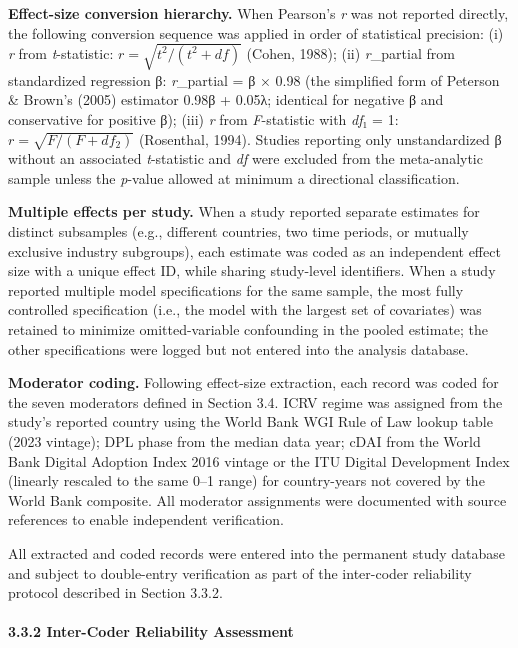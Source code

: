 \documentclass[
  12pt,a4paper]{article}
\begin{document}
\textbf{Effect-size conversion hierarchy.} When Pearson's \emph{r} was
not reported directly, the following conversion sequence was applied in
order of statistical precision: (i) \emph{r} from \emph{t}-statistic:
\(r = \sqrt{t^{2}/\left( t^{2} + df \right)}\) (Cohen, 1988); (ii)
\emph{r}\_partial from standardized regression β: \emph{r}\_partial = β
× 0.98 (the simplified form of Peterson \& Brown's (2005) estimator
0.98β + 0.05λ; identical for negative β and conservative for positive
β); (iii) \emph{r} from \emph{F}-statistic with \emph{df}₁ = 1:
\(r = \sqrt{F/\left( F + df_{2} \right)}\) (Rosenthal, 1994). Studies
reporting only unstandardized β without an associated \emph{t}-statistic
and \emph{df} were excluded from the meta-analytic sample unless the
\emph{p}-value allowed at minimum a directional classification.

\textbf{Multiple effects per study.} When a study reported separate
estimates for distinct subsamples (e.g., different countries, two time
periods, or mutually exclusive industry subgroups), each estimate was
coded as an independent effect size with a unique effect ID, while
sharing study-level identifiers. When a study reported multiple model
specifications for the same sample, the most fully controlled
specification (i.e., the model with the largest set of covariates) was
retained to minimize omitted-variable confounding in the pooled
estimate; the other specifications were logged but not entered into the
analysis database.

\textbf{Moderator coding.} Following effect-size extraction, each record
was coded for the seven moderators defined in Section 3.4. ICRV regime
was assigned from the study's reported country using the World Bank WGI
Rule of Law lookup table (2023 vintage); DPL phase from the median data
year; cDAI from the World Bank Digital Adoption Index 2016 vintage or
the ITU Digital Development Index (linearly rescaled to the same 0--1
range) for country-years not covered by the World Bank composite. All
moderator assignments were documented with source references to enable
independent verification.

All extracted and coded records were entered into the permanent study
database and subject to double-entry verification as part of the
inter-coder reliability protocol described in Section 3.3.2.

\hypertarget{inter-coder-reliability-assessment}{%
\paragraph{3.3.2 Inter-Coder Reliability
Assessment}\label{inter-coder-reliability-assessment}}
\end{document}
